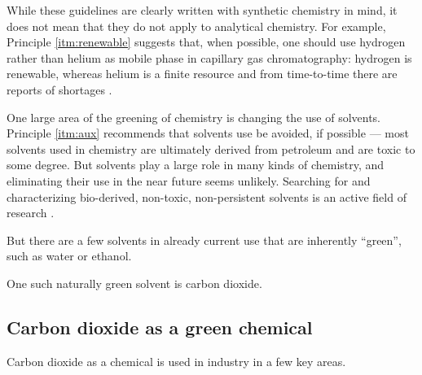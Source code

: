 While these guidelines are clearly written with synthetic chemistry in mind, it
does not mean that they do not apply to analytical chemistry. For example,
Principle \ref{itm:renewable} suggests that, when possible, one should use
hydrogen rather than helium as mobile phase in capillary gas chromatography:
hydrogen is renewable, whereas helium is a finite resource and from time-to-time
there are reports of shortages \autocite{Kornblut2019}.

One large area of the greening of chemistry is changing the use of solvents.
Principle \ref{itm:aux} recommends that solvents use be avoided, if possible ---
most solvents used in chemistry are ultimately derived from petroleum and are
toxic to some degree. But solvents play a large role in many kinds of chemistry,
and eliminating their use in the near future seems unlikely. Searching for and
characterizing bio-derived, non-toxic, non-persistent solvents is an active
field of research \autocite{Clarke2018}.


But there are a few solvents in already current use that are inherently
``green'', such as water or ethanol.

One such naturally green solvent is carbon dioxide. 
 

\subsection{Carbon dioxide as a green chemical}

Carbon dioxide as a chemical is used in industry in a few key areas.

